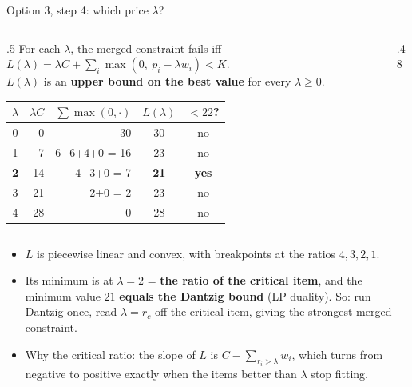 \documentclass[aspectratio=169,11pt]{beamer}
\begin{document}
\begin{frame}{Option 3, step 4: which price $\lambda$?}
\footnotesize
\begin{columns}[T]
\begin{column}{.5\textwidth}
For each $\lambda$, the merged constraint fails iff
\(
L(\lambda) = \lambda C + \sum_i \max(0,\ p_i - \lambda w_i) < K .
\)\\[1mm]
$L(\lambda)$ is an \textbf{upper bound on the best value} for every $\lambda\ge0$.
\begin{center}\scriptsize\renewcommand{\arraystretch}{0.95}
\begin{tabular}{crrcc}\toprule
$\lambda$ & $\lambda C$ & $\sum\max(0,\cdot)$ & $L(\lambda)$ & $< 22$?\\\midrule
0 & 0 & 30 & 30 & no\\
1 & 7 & 6+6+4+0 = 16 & 23 & no\\
\textbf{2} & 14 & 4+3+0 = 7 & \textbf{21} & \textbf{yes}\\
3 & 21 & 2+0 = 2 & 23 & no\\
4 & 28 & 0 & 28 & no\\\bottomrule
\end{tabular}
\end{center}
\end{column}
\begin{column}{.48\textwidth}
\centering
{}
\end{column}
\end{columns}
\scriptsize
\begin{itemize}\setlength\itemsep{1pt}
\item $L$ is piecewise linear and convex, with breakpoints at the ratios $4,3,2,1$.
\item Its minimum is at $\lambda = 2$ = \textbf{the ratio of the critical item}, and the minimum value $21$ \textbf{equals the Dantzig
  bound} (LP duality). So: run Dantzig once, read $\lambda = r_c$ off the critical item, giving the strongest merged constraint.
\item Why the critical ratio: the slope of $L$ is $C - \sum_{r_i > \lambda} w_i$, which turns from negative to positive exactly
  when the items better than $\lambda$ stop fitting.
\end{itemize}
\end{frame}
\end{document}
